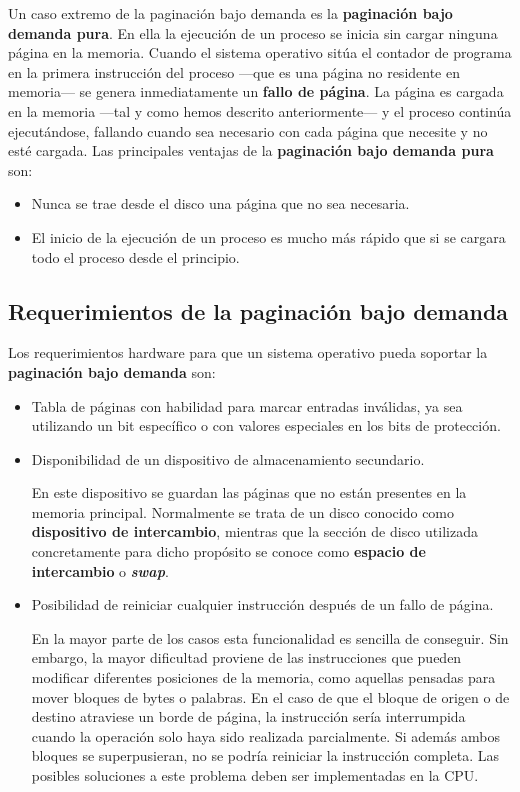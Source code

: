 Un caso extremo de la paginación bajo demanda es la \textbf{paginación
bajo demanda pura}{}. En ella la ejecución de un proceso se inicia sin
cargar ninguna página en la memoria. Cuando el sistema operativo sitúa
el contador de programa en la primera instrucción del proceso ---que es
una página no residente en memoria--- se genera inmediatamente un
\textbf{fallo de página}. La página es cargada en la memoria ---tal y
como hemos descrito anteriormente--- y el proceso continúa ejecutándose,
fallando cuando sea necesario con cada página que necesite y no esté
cargada. Las principales ventajas de la \textbf{paginación bajo demanda
pura} son:

\begin{itemize}
\item
  Nunca se trae desde el disco una página que no sea necesaria.
\item
  El inicio de la ejecución de un proceso es mucho más rápido que si se
  cargara todo el proceso desde el principio.
\end{itemize}

\subsection{Requerimientos de la paginación bajo
demanda}\label{_requerimientos_de_la_paginaciuxf3n_bajo_demanda}

Los requerimientos hardware para que un sistema operativo pueda soportar
la \textbf{paginación bajo demanda} son:

\begin{itemize}
\item
  Tabla de páginas con habilidad para marcar entradas inválidas, ya sea
  utilizando un bit específico o con valores especiales en los bits de
  protección.
\item
  Disponibilidad de un dispositivo de almacenamiento secundario.

  En este dispositivo se guardan las páginas que no están presentes en
  la memoria principal. Normalmente se trata de un disco conocido como
  \textbf{{}dispositivo de intercambio}, mientras que la sección de
  disco utilizada concretamente para dicho propósito se conoce como
  \textbf{espacio de intercambio}{} o \textbf{\emph{swap}}.
\item
  Posibilidad de reiniciar cualquier instrucción después de un fallo de
  página.

  En la mayor parte de los casos esta funcionalidad es sencilla de
  conseguir. Sin embargo, la mayor dificultad proviene de las
  instrucciones que pueden modificar diferentes posiciones de la
  memoria, como aquellas pensadas para mover bloques de bytes o
  palabras. En el caso de que el bloque de origen o de destino atraviese
  un borde de página, la instrucción sería interrumpida cuando la
  operación solo haya sido realizada parcialmente. Si además ambos
  bloques se superpusieran, no se podría reiniciar la instrucción
  completa. Las posibles soluciones a este problema deben ser
  implementadas en la CPU.
\end{itemize}

